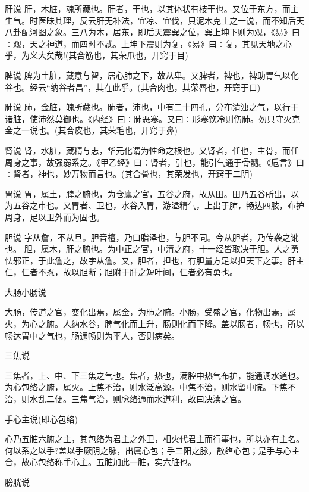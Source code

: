 \documentclass[a4paper,12pt,UTF8,twoside]{ctexbook}
\begin{document}
	肝说
	肝，木脏，魂所藏也。肝者，干也，以其体状有枝干也。又位于东方，而主生气。时医昧其理，反云肝无补法，宜凉、宜伐，只泥木克土之一说，而不知后天八卦配河图之象。三八为木，居东，即后天震巽之位，巽上坤下则为观，《易》曰∶观，天之神道，而四时不忒。上坤下震则为复，《易》曰∶复，其见天地之心乎，为义大矣哉!(其合筋也，其荣爪也，开窍于目)
	
	脾说
	脾为土脏，藏意与智，居心肺之下，故从卑。又脾者，裨也，裨助胃气以化谷也。经云“纳谷者昌”，其在此乎。(其合肉也，其荣唇也，开窍于口)
	
	肺说
	肺，金脏，魄所藏也。肺者，沛也，中有二十四孔，分布清浊之气，以行于诸脏，使沛然莫御也。《内经》曰∶肺恶寒。又曰∶形寒饮冷则伤肺。勿只守火克金之一说也。(其合皮也，其荣毛也，开窍于鼻)
	
	肾说
	肾，水脏，藏精与志，华元化谓为性命之根也。又肾者，任也，主骨，而任周身之事，故强弱系之。《甲乙经》曰∶肾者，引也，能引气通于骨髓。《卮言》曰∶肾者，神也，妙万物而言也。(其合骨也，其荣发也，开窍于二阴)
	
	胃说
	胃，属土，脾之腑也，为仓廪之官，五谷之府，故从田。田乃五谷所出，以为五谷之市也。又胃者、卫也，水谷入胃，游溢精气，上出于肺，畅达四肢，布护周身，足以卫外而为固也。
	
	胆说
	字从詹，不从旦。胆音檀，乃口脂泽也，与胆不同。今从胆者，乃传袭之讹也。
	胆，属木，肝之腑也。为中正之官，中清之府，十一经皆取决于胆。人之勇怯邪正，于此詹之，故字从詹。又，胆者，担也，有胆量方足以担天下之事。肝主仁，仁者不忍，故以胆断；胆附于肝之短叶间，仁者必有勇也。
	
	大肠小肠说
  
	大肠，传道之官，变化出焉，属金，为肺之腑。小肠，受盛之官，化物出焉，属火，为心之腑。人纳水谷，脾气化而上升，肠则化而下降。盖以肠者，畅也，所以畅达胃中之气也，肠通畅则为平人，否则病矣。
	
	三焦说

	三焦者，上、中、下三焦之气也。焦者，热也，满腔中热气布护，能通调水道也。为心包络之腑，属火。上焦不治，则水泛高源。中焦不治，则水留中脘。下焦不治，则水乱二便。三焦气治，则脉络通而水道利，故曰决渎之官。
	
	手心主说(即心包络)	
  
  心乃五脏六腑之主，其包络为君主之外卫，相火代君主而行事也，所以亦有主名。何以系之以手?盖以手厥阴之脉，出属心包；手三阳之脉，散络心包；是手与心主合，故心包络称手心主。五脏加此一脏，实六脏也。
	
	膀胱说
\end{document}
